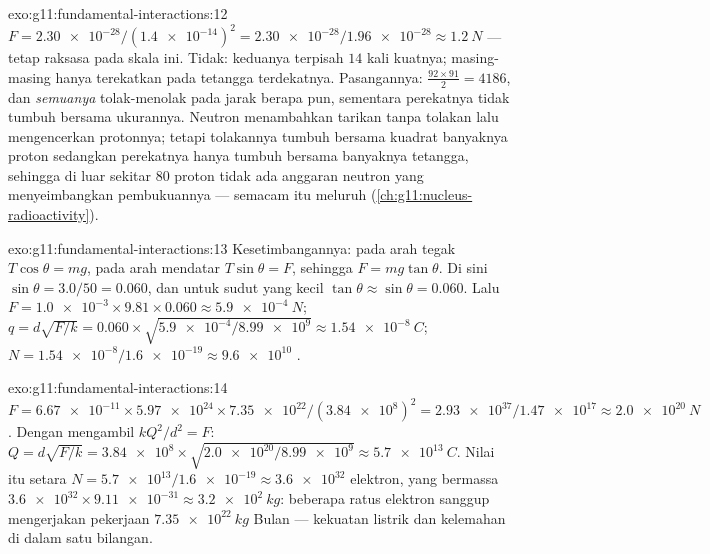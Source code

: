 \begin{solution}{exo:g11:fundamental-interactions:12}
$F = \num{2.30e-28}/(\num{1.4e-14})^2 = \num{2.30e-28}/\num{1.96e-28}
\approx \qty{1.2}{N}$ --- tetap raksasa pada skala ini. Tidak: keduanya
terpisah $14$ kali   kuatnya; masing-masing hanya
terekatkan pada tetangga terdekatnya. Pasangannya:
$\frac{92 \times 91}{2} = 4186$, dan \emph{semuanya} tolak-menolak pada
jarak berapa pun, sementara perekatnya tidak tumbuh bersama ukurannya.
Neutron menambahkan tarikan tanpa tolakan lalu mengencerkan protonnya;
tetapi tolakannya tumbuh bersama kuadrat banyaknya proton sedangkan
perekatnya hanya tumbuh bersama banyaknya tetangga, sehingga di luar
sekitar $80$ proton tidak ada anggaran neutron yang menyeimbangkan
pembukuannya ---  semacam itu meluruh
(\cref{ch:g11:nucleus-radioactivity}).
\end{solution}

\begin{solution}{exo:g11:fundamental-interactions:13}
Kesetimbangannya: pada arah tegak $T\cos\theta = mg$, pada arah
mendatar $T\sin\theta = F$, sehingga $F = mg\tan\theta$. Di sini
$\sin\theta = 3.0/50 = 0.060$, dan untuk sudut yang kecil
$\tan\theta \approx \sin\theta = 0.060$. Lalu
$F = \num{1.0e-3} \times 9.81 \times 0.060 \approx \qty{5.9e-4}{N}$;
$q = d\sqrt{F/k} = 0.060 \times \sqrt{\num{5.9e-4}/\num{8.99e9}}
\approx \qty{1.54e-8}{C}$; $N = \num{1.54e-8}/\num{1.6e-19} \approx
\num{9.6e10}$ .
\end{solution}

\begin{solution}{exo:g11:fundamental-interactions:14}
$F = \num{6.67e-11} \times \num{5.97e24} \times \num{7.35e22} /
(\num{3.84e8})^2 = \num{2.93e37}/\num{1.47e17} \approx \qty{2.0e20}{N}$.
Dengan mengambil $kQ^2/d^2 = F$:
$Q = d\sqrt{F/k} = \num{3.84e8} \times \sqrt{\num{2.0e20}/\num{8.99e9}}
\approx \qty{5.7e13}{C}$. Nilai itu setara
$N = \num{5.7e13}/\num{1.6e-19} \approx \num{3.6e32}$ elektron, yang
bermassa $\num{3.6e32} \times \num{9.11e-31} \approx \qty{3.2e2}{kg}$:
beberapa ratus  elektron sanggup mengerjakan pekerjaan
$\qty{7.35e22}{kg}$ Bulan --- kekuatan listrik dan kelemahan 
di dalam satu bilangan.
\end{solution}

